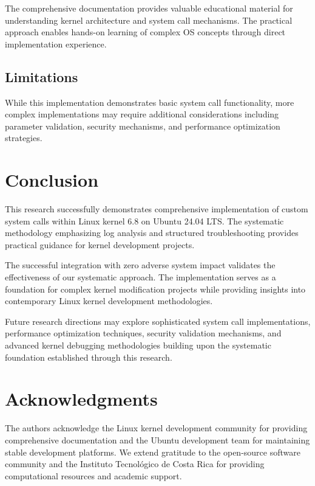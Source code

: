 \documentclass[conference]{IEEEtran}
\begin{document}
The comprehensive documentation provides valuable educational material for understanding kernel architecture and system call mechanisms. The practical approach enables hands-on learning of complex \gls{OS} concepts through direct implementation experience.

\subsection{Limitations}

While this implementation demonstrates basic system call functionality, more complex implementations may require additional considerations including parameter validation, security mechanisms, and performance optimization strategies.

\section{Conclusion}

This research successfully demonstrates comprehensive implementation of custom system calls within Linux kernel 6.8 on Ubuntu 24.04 \gls{LTS}. The systematic methodology emphasizing log analysis and structured troubleshooting provides practical guidance for kernel development projects.

The successful integration with zero adverse system impact validates the effectiveness of our systematic approach. The implementation serves as a foundation for complex kernel modification projects while providing insights into contemporary Linux kernel development methodologies.

Future research directions may explore sophisticated system call implementations, performance optimization techniques, security validation mechanisms, and advanced kernel debugging methodologies building upon the systematic foundation established through this research.

\section*{Acknowledgments}

The authors acknowledge the Linux kernel development community for providing comprehensive documentation and the Ubuntu development team for maintaining stable development platforms. We extend gratitude to the open-source software community and the Instituto Tecnol{\'o}gico de Costa Rica for providing computational resources and academic support.

\printglossary[type=\acronymtype]



\end{document}
